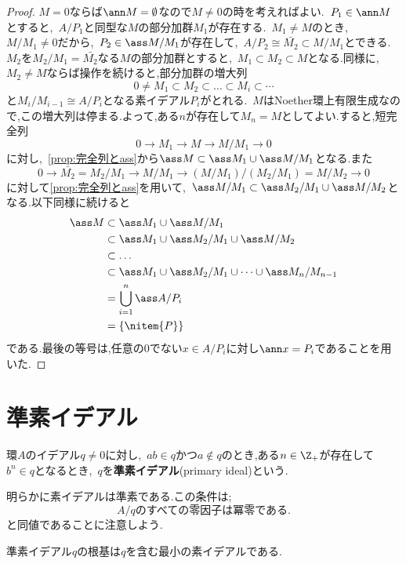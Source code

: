 \begin{proof}
	$M=0$ならば$\ann M=\emptyset$なので$M\neq0$の時を考えればよい.~$ P_1\in\ann M$
	とすると,~$A/ P_1$と同型な$M$の部分加群$M_1$が存在する.~$M_1\neq M$のとき,~$M/M_1\neq0$だから,~$ P_2\in\ass M/M_1$が存在して,~$A/ P_2\cong\bar{M_2}\subset M/M_1$とできる.~$M_2$を$M_2/M_1=\bar{M_2}$なる$M$の部分加群とすると,~$M_1\subset M_2\subset M$となる.同様に,~$M_2\neq M$ならば操作を続けると,部分加群の増大列
	\[0\neq M_1\subset M_2\subset\dots\subset M_i\subset\cdots\]
	と$M_i/M_{i-1}\cong A/ P_i$となる素イデアル$ P_i$がとれる.~$M$はNoether環上有限生成なので,この増大列は停まる.よって,ある$n$が存在して$M_n=M$としてよい.すると,短完全列
	\[0\longrightarrow M_1\longrightarrow M\longrightarrow M/M_1\longrightarrow0\]
	に対し,~\ref{prop:完全列とass}から$\ass M\subset \ass M_1\cup \ass M/M_1$となる.また
	\[0\longrightarrow \bar{M_2}=M_2/M_1\longrightarrow M/M_1\longrightarrow (M/M_1)/(M_2/M_1)=M/M_2\longrightarrow0\]
	に対して\ref{prop:完全列とass}を用いて,~$\ass M/M_1\subset \ass M_2/M_1\cup \ass M/M_2$となる.以下同様に続けると
	\[\begin{aligned}
		\ass M&\subset\ass M_1\cup \ass M/M_1\\
		&\subset \ass M_1\cup \ass M_2/M_1\cup \ass M/M_2\\
		&\subset\dots\\
		&\subset\ass M_1\cup\ass M_2/M_1\cup\dots\cup\ass M_n/M_{n-1}\\
		&=\bigcup_{i=1}^n\ass A/ P_i\\
		&=\{\nitem{ P}\}
	\end{aligned}\]
	である.最後の等号は,任意の0でない$x\in A/ P_i$に対し$\ann x= P_i$であることを用いた.
\end{proof}
\section{準素イデアル}
\begin{defi}[準素イデアル]
	環$A$のイデアル$ q\neq0$に対し,~$ab\in q$かつ$a\not\in q$のとき,ある$n\in\Z_+$が存在して$b^n\in q$となるとき,~$ q$を\textbf{準素イデアル}(primary ideal)という.
\end{defi}

明らかに素イデアルは準素である.この条件は;
\[A/q\text{のすべての零因子は冪零である.}\]
と同値であることに注意しよう.

\begin{prop}
	準素イデアル$ q$の根基は$ q$を含む最小の素イデアルである.
\end{prop}

